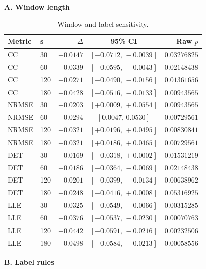 \documentclass[conference,a4paper]{IEEEtran}
\renewcommand{\thetable}{S\arabic{table}}
\begin{document}
\begin{table}[!tbp]
\renewcommand{\thetable}{S\arabic{table}A}
\centering
\caption{Window and label sensitivity.}
\label{tab:supp_sensitivity}
\footnotesize
\setlength{\tabcolsep}{1.5pt}
\renewcommand{\arraystretch}{1.12}

\begin{minipage}[t]{0.49\textwidth}
\raggedright
\textbf{A. Window length}\par\smallskip

\begin{tabular*}{\linewidth}{@{\extracolsep{\fill}}llrcr@{}}
\toprule
Metric & s & $\Delta$ & 95\% CI & Raw $p$\\
\midrule
CC    & 30  & $-0.0147$ & $[-0.0712,\,-0.0039]$ & $0.03276825$\\
CC    & 60  & $-0.0339$ & $[-0.0595,\,-0.0043]$ & $0.02148438$\\
CC    & 120 & $-0.0271$ & $[-0.0490,\,-0.0156]$ & $0.01361656$\\
CC    & 180 & $-0.0428$ & $[-0.0516,\,-0.0133]$ & $0.00943565$\\
NRMSE & 30  & $+0.0203$ & $[+0.0009,\,+0.0554]$ & $0.00943565$\\
NRMSE & 60  & $+0.0294$ & $[0.0047,\,0.0530]$   & $0.00729561$\\
NRMSE & 120 & $+0.0321$ & $[+0.0196,\,+0.0495]$ & $0.00830841$\\
NRMSE & 180 & $+0.0321$ & $[+0.0186,\,+0.0465]$ & $0.00729561$\\
DET   & 30  & $-0.0169$ & $[-0.0318,\,+0.0002]$ & $0.01531219$\\
DET   & 60  & $-0.0186$ & $[-0.0364,\,-0.0069]$ & $0.02148438$\\
DET   & 120 & $-0.0201$ & $[-0.0399,\,-0.0134]$ & $0.00638962$\\
DET   & 180 & $-0.0248$ & $[-0.0416,\,+0.0008]$ & $0.05316925$\\
LLE   & 30  & $-0.0325$ & $[-0.0549,\,-0.0066]$ & $0.00315285$\\
LLE   & 60  & $-0.0376$ & $[-0.0537,\,-0.0230]$ & $0.00070763$\\
LLE   & 120 & $-0.0442$ & $[-0.0591,\,-0.0216]$ & $0.00232506$\\
LLE   & 180 & $-0.0498$ & $[-0.0584,\,-0.0213]$ & $0.00058556$\\
\bottomrule
\end{tabular*}
\end{minipage}
\hfill
\begin{minipage}[t]{0.49\textwidth}
\raggedright
\textbf{B. Label rules}\par\smallskip


\end{minipage}
\end{table}
\end{document}
